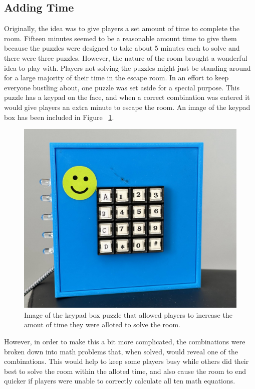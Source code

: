 \documentclass[conference]{IEEEtran}
\begin{document}
\subsection{Adding Time} %

\indent Originally, the idea was to give players a set amount of time to complete the room. Fifteen minutes seemed to be a reasonable amount
time to give them because the puzzles were designed to take about 5 minutes each to solve and there were three puzzles. However,
the nature of the room brought a wonderful idea to play with. Players not solving the puzzles might
just be standing around for a large majority of their time in the escape room. In an effort to keep everyone bustling about, one puzzle was set aside for a special purpose. 
This puzzle has a keypad on the face, and when a correct combination was entered it would give players an extra minute to escape the room. An image of the keypad box has been included in Figure ~\ref{fig:keypad}.

\begin{figure}[ht]
    \centering
    \includegraphics[width=0.90\columnwidth]{Images/keypad.jpg}
    \caption{Image of the keypad box puzzle that allowed players to increase the amout of time they were alloted to solve the room.}
    \label{fig:keypad}
\end{figure}

\indent However, in order to make this a bit more complicated, the combinations were broken down
into math problems that, when solved, would reveal one of the combinations. This would help to keep some players busy while others did their best to solve
the room within the alloted time, and also cause the room to end quicker if players were unable to correctly calculate all ten math equations.
\end{document}
